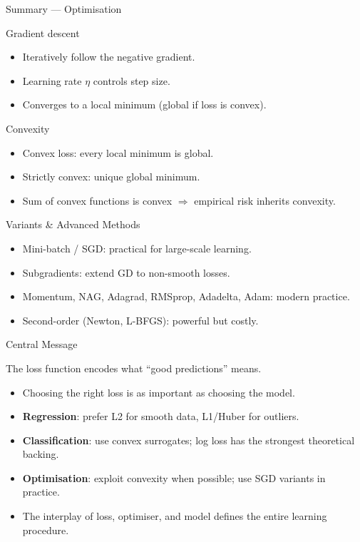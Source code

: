 \begin{frame}{Summary — Optimisation}
  \begin{block}{Gradient descent}
    \begin{itemize}
      \item Iteratively follow the negative gradient.
      \item Learning rate $\eta$ controls step size.
      \item Converges to a local minimum (global if loss is convex).
    \end{itemize}
  \end{block}
  \begin{block}{Convexity}
    \begin{itemize}
      \item Convex loss: every local minimum is global.
      \item Strictly convex: unique global minimum.
      \item Sum of convex functions is convex $\Rightarrow$ empirical risk inherits convexity.
    \end{itemize}
  \end{block}
  \begin{block}{Variants \& Advanced Methods}
    \begin{itemize}
      \item Mini-batch / SGD: practical for large-scale learning.
      \item Subgradients: extend GD to non-smooth losses.
      \item Momentum, NAG, Adagrad, RMSprop, Adadelta, Adam: modern practice.
      \item Second-order (Newton, L-BFGS): powerful but costly.
    \end{itemize}
  \end{block}
\end{frame}

\begin{frame}{Central Message}
  \begin{center}
    \Large
    The loss function encodes what ``good predictions'' means.
  \end{center}
  \vspace{10pt}
  \begin{itemize}
    \item Choosing the right loss is as important as choosing the model.
    \item \textbf{Regression}: prefer L2 for smooth data, L1/Huber for outliers.
    \item \textbf{Classification}: use convex surrogates; log loss has the strongest theoretical backing.
    \item \textbf{Optimisation}: exploit convexity when possible; use SGD variants in practice.
    \item The interplay of loss, optimiser, and model defines the entire learning procedure.
  \end{itemize}
\end{frame}


